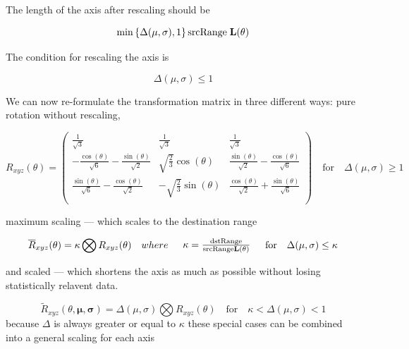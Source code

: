 The length of the axis after rescaling should be

\begin{equation}\label{eq:RescaleAxis}
\min\left\{ \Delta(\mu,\sigma) , 1\right\} \text{srcRange} \; \mathbf{L}(\theta)
\end{equation}

The condition for rescaling the axis is

\begin{equation}\label{eq:RescaleAxisCondition}
\Delta(\mu,\sigma) \le 1
\end{equation}

We can now re-formulate the transformation matrix in three different ways: pure rotation without rescaling, 

\begin{equation}\label{eq:Rotation}
 R_{xyz}(\theta) = \left(
\begin{array}{ccc}
 \frac{1}{\sqrt{3}} & \frac{1}{\sqrt{3}} & \frac{1}{\sqrt{3}} \\
 -\frac{\cos (\theta )}{\sqrt{6}}-\frac{\sin (\theta )}{\sqrt{2}} &
 \sqrt{\frac{2}{3}} \cos (\theta ) &
 \frac{\sin (\theta )}{\sqrt{2}}-\frac{\cos (\theta )}{\sqrt{6}} \\
 \frac{\sin (\theta )}{\sqrt{6}}-\frac{\cos (\theta )}{\sqrt{2}} &
 -\sqrt{\frac{2}{3}} \sin (\theta ) &
 \frac{\cos (\theta )}{\sqrt{2}}+\frac{\sin (\theta )}{\sqrt{6}} \\
\end{array}
\right) \quad \text{for} \quad  \Delta(\mu,\sigma) \ge 1
\end{equation}

maximum scaling --- which scales to the destination range


\begin{equation}\label{eq:NormRxyz2}
 \overline{R}_{xyz}(\theta) =
\kappa
\bigotimes
R_{xyz}(\theta) \quad where \quad
\begin{array}{c}
\kappa = \frac{\text{dstRange} }{\text{srcRange} \mathbf{L}(\theta)}
\end{array} \quad \text{for} \quad    \Delta(\mu,\sigma) \le \kappa
\end{equation}

 and scaled --- which shortens the axis as much as possible without losing statistically relavent data. 

\begin{equation}\label{eq:CompressedRotation}
 \widetilde{R}_{xyz}(\theta,\mathbf{\mu},\mathbf{\sigma}) =
\Delta(\mu,\sigma)
\bigotimes
R_{xyz}(\theta) \quad \text{for} \quad  \kappa < \Delta(\mu,\sigma) < 1
\end{equation}
because $\Delta$ is always greater or equal to $\kappa$ these special cases can be combined into a general scaling for each axis


